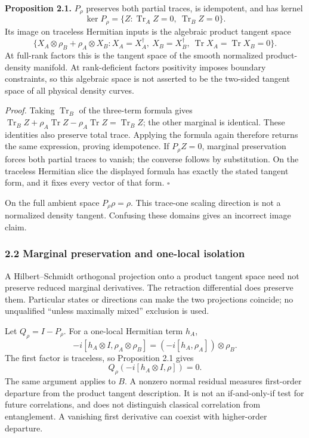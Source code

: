 \documentclass[
]{article}
\begin{document}
\textbf{Proposition 2.1.} \(P_\rho\) preserves both partial traces, is idempotent, and has kernel
\[
\ker P_\rho=\{Z:\operatorname{Tr}_A Z=0,\ \operatorname{Tr}_B Z=0\}.
\]
Its image on traceless Hermitian inputs is the algebraic product tangent space
\[
\{X_A\otimes\rho_B+\rho_A\otimes X_B:
 X_A=X_A^\dagger,\ X_B=X_B^\dagger,\
 \operatorname{Tr}X_A=\operatorname{Tr}X_B=0\}.
\]
At full-rank factors this is the tangent space of the smooth normalized product-density manifold. At rank-deficient factors positivity imposes boundary constraints, so this algebraic space is not asserted to be the two-sided tangent space of all physical density curves.

\emph{Proof.} Taking \(\operatorname{Tr}_B\) of the three-term formula gives
\(\operatorname{Tr}_B Z+\rho_A\operatorname{Tr}Z-\rho_A\operatorname{Tr}Z
=\operatorname{Tr}_B Z\); the other marginal is identical. These identities also preserve total trace. Applying the formula again therefore returns the same expression, proving idempotence. If \(P_\rho Z=0\), marginal preservation forces both partial traces to vanish; the converse follows by substitution. On the traceless Hermitian slice the displayed formula has exactly the stated tangent form, and it fixes every vector of that form. \(\square\)

On the full ambient space \(P_\rho\rho=\rho\). This trace-one scaling direction is not a normalized density tangent. Confusing these domains gives an incorrect image claim.

\subsubsection{2.2 Marginal preservation and one-local isolation}\label{marginal-preservation-and-one-local-isolation}

A Hilbert--Schmidt orthogonal projection onto a product tangent space need not preserve reduced marginal derivatives. The retraction differential does preserve them. Particular states or directions can make the two projections coincide; no unqualified ``unless maximally mixed'' exclusion is used.

Let \(Q_\rho=I-P_\rho\). For a one-local Hermitian term \(h_A\),
\[
-i[h_A\otimes I,\rho_A\otimes\rho_B]
=(-i[h_A,\rho_A])\otimes\rho_B.
\]
The first factor is traceless, so Proposition 2.1 gives
\[
Q_\rho(-i[h_A\otimes I,\rho])=0.
\]
The same argument applies to \(B\). A nonzero normal residual measures first-order departure from the product tangent description. It is not an if-and-only-if test for future correlations, and does not distinguish classical correlation from entanglement. A vanishing first derivative can coexist with higher-order departure.
\end{document}
